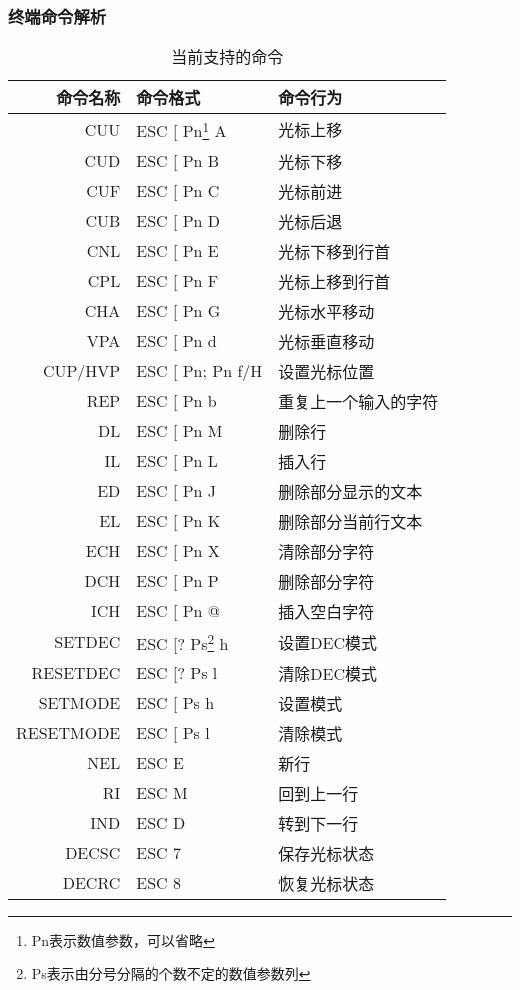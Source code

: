 \subsubsection{终端命令解析}

\begin{longtable}{|r|l|l|}
	\caption{当前支持的命令} 
\label{tab:supported-commands} \\

\hline
\textbf{命令名称} & \textbf{命令格式} & \textbf{命令行为} \\ \hline
CUU & ESC [ Pn\footnote{Pn表示数值参数，可以省略} A & 光标上移\\ \hline
CUD & ESC [ Pn B & 光标下移\\ \hline
CUF & ESC [ Pn C & 光标前进\\ \hline
CUB & ESC [ Pn D & 光标后退\\ \hline
CNL & ESC [ Pn E & 光标下移到行首\\ \hline
CPL & ESC [ Pn F & 光标上移到行首\\ \hline
CHA & ESC [ Pn G & 光标水平移动\\ \hline
VPA & ESC [ Pn d & 光标垂直移动\\ \hline
CUP/HVP & ESC [ Pn; Pn f/H & 设置光标位置\\ \hline \hline

REP & ESC [ Pn b & 重复上一个输入的字符 \\ \hline
DL & ESC [ Pn M &删除行 \\ \hline
IL & ESC [ Pn L &插入行 \\ \hline
ED &ESC [ Pn J &删除部分显示的文本 \\ \hline
EL &ESC [ Pn K &删除部分当前行文本 \\ \hline
ECH & ESC [ Pn X &清除部分字符 \\ \hline
DCH & ESC [ Pn P &删除部分字符 \\ \hline
ICH & ESC [ Pn @ &插入空白字符 \\ \hline \hline

SETDEC & ESC [? Ps\footnote{Ps表示由分号分隔的个数不定的数值参数列} h & 设置DEC模式 \\ \hline
RESETDEC & ESC [? Ps l & 清除DEC模式 \\ \hline
SETMODE &ESC [ Ps h & 设置模式 \\ \hline
RESETMODE & ESC [ Ps l &清除模式 \\ \hline \hline

NEL & ESC E &新行 \\ \hline
RI & ESC M & 回到上一行 \\ \hline
IND & ESC D &转到下一行 \\ \hline
DECSC & ESC 7& 保存光标状态 \\ \hline
DECRC &ESC 8& 恢复光标状态 \\ \hline \hline


\end{longtable}
